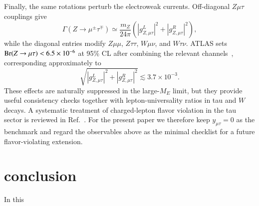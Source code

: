 \documentclass[onecolumn, aps, nofootinbib, prd, preprint, floats, floatfix, amsmath, amssymb, superscriptaddress, preprintnumbers]{revtex4-1}
\begin{document}
Finally, the same rotations perturb the electroweak currents. Off-diagonal \(Z\mu\tau\) couplings give
\begin{equation}
\Gamma(Z\to\mu^\pm\tau^\mp)\simeq
\frac{m_Z}{24\pi}
\left(|g_{Z,\mu\tau}^{L}|^2+|g_{Z,\mu\tau}^{R}|^2\right),
\label{eq:z-mutau-width}
\end{equation}
while the diagonal entries modify \(Z\mu\mu\), \(Z\tau\tau\), \(W\mu\nu\), and \(W\tau\nu\). ATLAS sets \({\rm Br}(Z\to\mu\tau)<6.5\times10^{-6}\) at 95\% CL after combining the relevant channels~\cite{ATLAS:2021bdj}, corresponding approximately to
\begin{equation}
\sqrt{|g_{Z,\mu\tau}^{L}|^2+|g_{Z,\mu\tau}^{R}|^2}
\lesssim 3.7\times10^{-3}.
\label{eq:z-mutau-coupling-bound}
\end{equation}
These effects are naturally suppressed in the large-\(M_E\) limit, but they provide useful consistency checks together with lepton-universality ratios in tau and \(W\) decays. A systematic treatment of charged-lepton flavor violation in the tau sector is reviewed in Ref.~\cite{Banerjee:2022xuw}. For the present paper we therefore keep \(y_{\mu\tau}=0\) as the benchmark and regard the observables above as the minimal checklist for a future flavor-violating extension.

\section{conclusion}

In this





\end{document}
